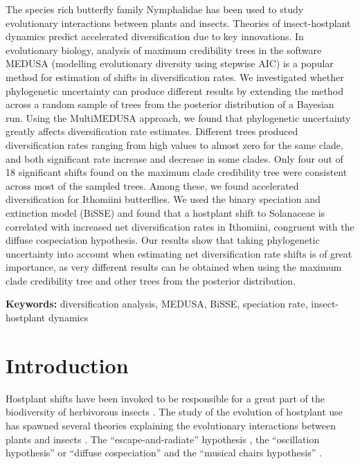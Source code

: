 \documentclass[10pt]{article}
\begin{document}
The species rich butterfly family Nymphalidae has been used to study
evolutionary interactions between plants and insects. Theories of
insect-hostplant dynamics predict accelerated diversification due to key
innovations. In evolutionary biology, analysis of maximum credibility
trees in the software MEDUSA (modelling evolutionary diversity using
stepwise AIC) is a popular method for estimation of shifts in
diversification rates. We investigated whether phylogenetic uncertainty
can produce different results by extending the method across a random
sample of trees from the posterior distribution of a Bayesian run. Using
the MultiMEDUSA approach, we found that phylogenetic uncertainty greatly
affects diversification rate estimates. Different trees produced
diversification rates ranging from high values to almost zero for the
same clade, and both significant rate increase and decrease in some
clades. Only four out of 18 significant shifts found on the maximum
clade credibility tree were consistent across most of the sampled trees.
Among these, we found accelerated diversification for Ithomiini
butterflies. We used the binary speciation and extinction model (BiSSE)
and found that a hostplant shift to Solanaceae is correlated with
increased net diversification rates in Ithomiini, congruent with the
diffuse cospeciation hypothesis. Our results show that taking
phylogenetic uncertainty into account when estimating net
diversification rate shifts is of great importance, as very different
results can be obtained when using the maximum clade credibility tree
and other trees from the posterior distribution.

\textbf{Keywords:} diversification analysis, MEDUSA, BiSSE, speciation
rate, insect-hostplant dynamics

\section*{Introduction}

Hostplant shifts have been invoked to be responsible for a great part of
the biodiversity of herbivorous insects \cite{mitter1988}. The study of the
evolution of hostplant use has spawned several theories explaining the
evolutionary interactions between plants and insects \cite{nyman2012}. The
``escape-and-radiate'' hypothesis \cite{ehrlich1964}, the 
``oscillation hypothesis''
\cite{janz2011,nylin2014} or ``diffuse cospeciation'' \cite{nyman2012} and the
``musical chairs hypothesis'' \cite{hardy2014}.
\end{document}
